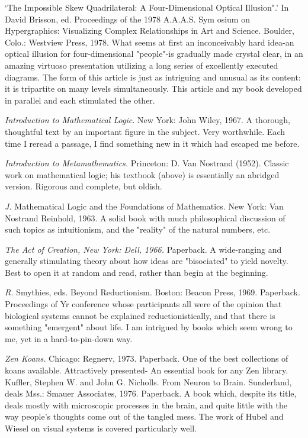  `The Impossible Skew Quadrilateral: A Four-Dimensional Optical Illusion".' \llap{*\enspace}In David Brisson, ed. Proceedings of the 1978 A.A.A.S. Sym osium on Hypergraphics: Visualizing Complex Relationships in Art and Science. Boulder, Colo.: Westview Press, 1978. What seems at first an inconceivably hard idea-an optical illusion for four-dimensional "people"-is gradually made crystal clear, in an amazing virtuoso presentation utilizing a long series of excellently executed diagrams. The form of this article is just as intriguing and unusual as its content: it is tripartite on many levels simultaneously. This article and my book developed in parallel and each stimulated the other.

 {\sl Introduction to Mathematical Logic.} New York: John Wiley, 1967. A thorough, thoughtful text by an important figure in the subject. Very worthwhile. Each time I reread a passage, I find something new in it which had escaped me before.

 {\sl Introduction to Metamathematics.} Princeton: D. Van Nostrand (1952). Classic work on mathematical logic; his textbook (above) is essentially an abridged version. Rigorous and complete, but oldish.

 {\sl J.} Mathematical Logic and the Foundations of Mathematics. New York: Van Nostrand Reinhold, 1963. A solid book with much philosophical discussion of such topics as intuitionism, and the "reality" of the natural numbers, etc.

 {\sl The Act of Creation, New York: Dell, 1966.} Paperback. A wide-ranging and generally stimulating theory about how ideas are "bisociated" to yield novelty. Best to open it at random and read, rather than begin at the beginning.

 {\sl R.} Smythies, eds. Beyond Reductionism. Boston: Beacon Press, 1969. Paperback. Proceedings of Yr conference whose participants all were of the opinion that biological systems cannot be explained reductionistically, and that there is something "emergent" about life. I am intrigued by books which seem wrong to me, yet in a hard-to-pin-down way.

 {\sl Zen Koans.} \llap{**\enspace}Chicago: Regnerv, 1973. Paperback. One of the best collections of koans available. Attractively presented- An essential book for any Zen library. Kuffler, Stephen W. and John G. Nicholls. From Neuron to Brain. Sunderland, deals Mss.: Smauer Associates, 1976. Paperback. A book which, despite its title, deals mostly with microscopic processes in the brain, and quite little with the way people's thoughts come out of the tangled mess. The work of Hubel and Wiesel on visual systems is covered particularly well.

